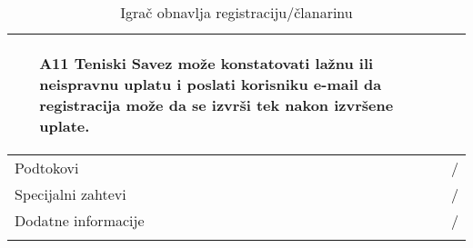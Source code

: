 \documentclass{article}
\begin{document}
\begin{longtable}{| p{} | p{} |}
\begin{itemize}
                    \item[A11] Teniski Savez može konstatovati lažnu ili neispravnu uplatu i poslati korisniku e-mail da registracija može da se izvrši tek nakon izvršene uplate.
                \end{itemize}\\
            \hline
                Podtokovi & /\\
            \hline
                Specijalni zahtevi & /\\
            \hline
                Dodatne informacije & / \\
            \hline
            \caption{Igrač obnavlja registraciju/članarinu}
        \end{longtable}
        
\end{document}
